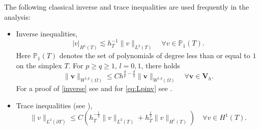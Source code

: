 \documentclass[10pt]{amsart}
\numberwithin{equation}{section}
\theoremstyle{definition}
\theoremstyle{remark}
\renewcommand{\(}{\bigl(}
\renewcommand{\)}{\bigr)}
\newcommand{\bld}[1]{\boldsymbol{#1}}
\newcommand{\bv}{\bld{v}}
\newcommand{\bV}{\bld{V}}
\begin{document}
The
 following classical inverse and trace inequalities are used
 frequently in the analysis:
\begin{itemize}
\item Inverse 
inequalities,
\begin{equation}\label{inverse}
|v|_{H^1(T)} \lesssim h^{-1}_T \|v\|_{L^2(T)}\quad \forall v \in \mathbb{P}_1(T).
\end{equation}
Here $\mathbb{P}_1(T)$ denotes the set of polynomials of
degree less than or equal to $1$ on the simplex $T$.
For $p\ge q\ge 1$, $l=0,1$, there holds
\begin{equation}\label{eq:Lpinv}
\|\bv\|_{W^{l,p}(\Omega)} \leq C h^{\frac{d}{p}-\frac{d}{q}}
\|\bv\|_{W^{l,q}(\Omega)}  \quad \forall \bv \in \bV_h.
\end{equation}
For a proof of \eqref{inverse} see \cite[Section 1.4.3]{DiPE12} and
for \eqref{eq:Lpinv} see
\cite[Corollary 1.141]{EG04}.
\item Trace inequalities (see \cite[Section 1.4.3]{DiPE12}),
\begin{equation}\label{trace_H1}
\|v\|_{L^2(\partial T)} \leq C \left( h_T^{-\frac12} \|v\|_{L^2(T)} +
h_T^{\frac12} \|v\|_{H^1(T)}\right)\quad \forall v \in H^1(T).
\end{equation}
\end{itemize}
\end{document}
